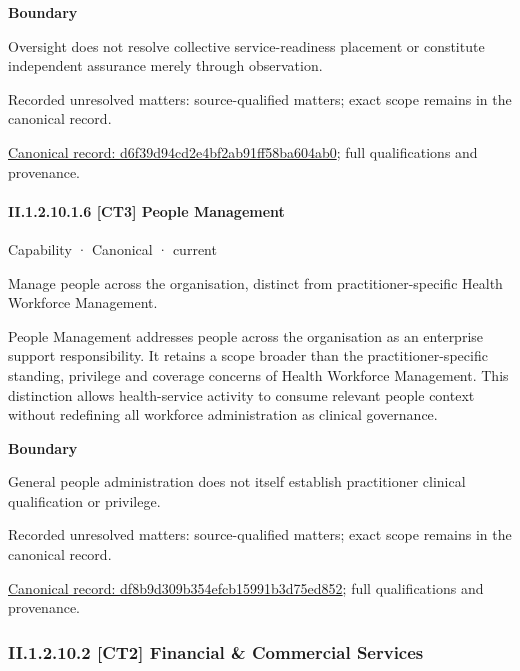 \textbf{Boundary}



Oversight does not resolve collective service-readiness placement or constitute independent assurance merely through observation.


{\small Recorded unresolved matters: source-qualified matters; exact scope remains in the canonical record.}\par
{\footnotesize \href{../../../../continuum/strategy/capability/d6f39d94cd2e4bf2ab91ff58ba604ab0.md}{Canonical record: d6f39d94cd2e4bf2ab91ff58ba604ab0}; full qualifications and provenance.}\par
\paragraph*{II.1.2.10.1.6 [CT3] People Management}
\label{navigation:II.1.2.10.1.6}

\label{element:df8b9d309b354efcb15991b3d75ed852}
{\small Capability · Canonical · current}\par

Manage people across the organisation, distinct from practitioner-specific Health Workforce Management.



People Management addresses people across the organisation as an enterprise support responsibility. It retains a scope broader than the practitioner-specific standing, privilege and coverage concerns of Health Workforce Management. This distinction allows health-service activity to consume relevant people context without redefining all workforce administration as clinical governance.



\textbf{Boundary}



General people administration does not itself establish practitioner clinical qualification or privilege.


{\small Recorded unresolved matters: source-qualified matters; exact scope remains in the canonical record.}\par
{\footnotesize \href{../../../../continuum/strategy/capability/df8b9d309b354efcb15991b3d75ed852.md}{Canonical record: df8b9d309b354efcb15991b3d75ed852}; full qualifications and provenance.}\par
\subsubsection*{II.1.2.10.2 [CT2] Financial \& Commercial Services}
\label{navigation:II.1.2.10.2}

